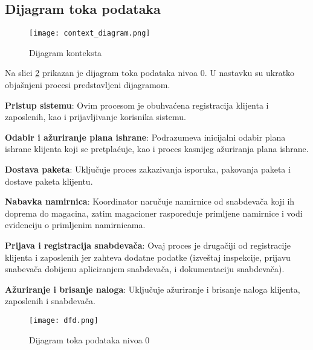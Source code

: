 \subsection{Dijagram toka podataka}

\begin{figure}[H]
\begin{center}
\texttt{[image: context\_diagram.png]}

    \caption{Dijagram konteksta}
    \end{center}
    \label{fig:activity_diagram}
\end{figure}
	
	Na slici \ref{fig:DFD} prikazan je dijagram toka podataka nivoa 0. U nastavku su ukratko objašnjeni procesi predstavljeni dijagramom.
	
	
	\textbf{Pristup sistemu}: Ovim procesom je obuhvaćena registracija klijenta i zaposlenih, kao i prijavljivanje korisnika sistemu. 
	
	\textbf{Odabir i ažuriranje plana ishrane}: Podrazumeva inicijalni odabir plana ishrane klijenta koji se pretplaćuje, kao i proces kasnijeg ažuriranja plana ishrane.
		
	\textbf{Dostava paketa}: Uključuje proces zakazivanja isporuka, pakovanja paketa i dostave paketa klijentu. 
	
	
	\textbf{Nabavka namirnica}: Koordinator naručuje namirnice od snabdevača koji ih doprema do magacina, zatim magacioner raspoređuje primljene namirnice i vodi evidenciju o primljenim namirnicama.
	
	
	\textbf{Prijava i registracija snabdevača}: Ovaj proces je drugačiji od registracije klijenta i zaposlenih jer zahteva dodatne podatke (izveštaj inspekcije, prijavu snabevača dobijenu apliciranjem snabdevača, i dokumentaciju snabdevača).
	
	\textbf{Ažuriranje i brisanje naloga}: Uključuje ažuriranje i brisanje naloga klijenta, zaposlenih i snabdevača.


\begin{figure}[H]
\begin{center}
\texttt{[image: dfd.png]}

    \caption{Dijagram toka podataka nivoa 0}
    \end{center}
    \label{fig:DFD}
\end{figure}

	